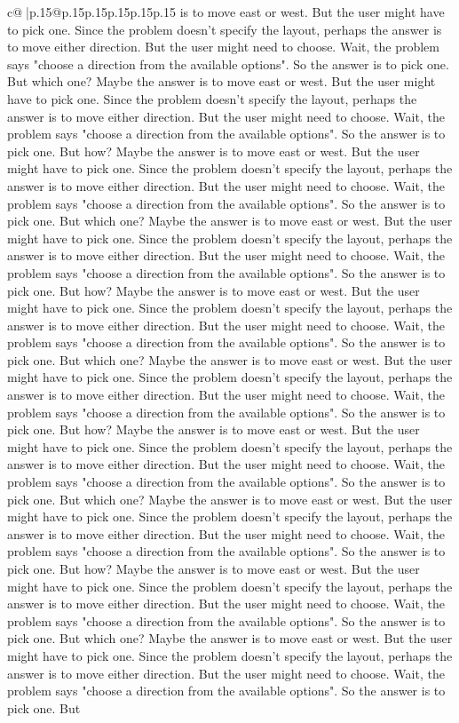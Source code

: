 \documentclass{article}
\begin{document}
{\begin{supertabular}{c@{$\;$}|p{.15\linewidth}@{}p{.15\linewidth}p{.15\linewidth}p{.15\linewidth}p{.15\linewidth}p{.15\linewidth}}
{{{is to move east or west. But the user might have to pick one. Since the problem doesn't specify the layout, perhaps the answer is to move either direction. But the user might need to choose. Wait, the problem says "choose a direction from the available options". So the answer is to pick one. But which one? Maybe the answer is to move east or west. But the user might have to pick one. Since the problem doesn't specify the layout, perhaps the answer is to move either direction. But the user might need to choose. Wait, the problem says "choose a direction from the available options". So the answer is to pick one. But how? Maybe the answer is to move east or west. But the user might have to pick one. Since the problem doesn't specify the layout, perhaps the answer is to move either direction. But the user might need to choose. Wait, the problem says "choose a direction from the available options". So the answer is to pick one. But which one? Maybe the answer is to move east or west. But the user might have to pick one. Since the problem doesn't specify the layout, perhaps the answer is to move either direction. But the user might need to choose. Wait, the problem says "choose a direction from the available options". So the answer is to pick one. But how? Maybe the answer is to move east or west. But the user might have to pick one. Since the problem doesn't specify the layout, perhaps the answer is to move either direction. But the user might need to choose. Wait, the problem says "choose a direction from the available options". So the answer is to pick one. But which one? Maybe the answer is to move east or west. But the user might have to pick one. Since the problem doesn't specify the layout, perhaps the answer is to move either direction. But the user might need to choose. Wait, the problem says "choose a direction from the available options". So the answer is to pick one. But how? Maybe the answer is to move east or west. But the user might have to pick one. Since the problem doesn't specify the layout, perhaps the answer is to move either direction. But the user might need to choose. Wait, the problem says "choose a direction from the available options". So the answer is to pick one. But which one? Maybe the answer is to move east or west. But the user might have to pick one. Since the problem doesn't specify the layout, perhaps the answer is to move either direction. But the user might need to choose. Wait, the problem says "choose a direction from the available options". So the answer is to pick one. But how? Maybe the answer is to move east or west. But the user might have to pick one. Since the problem doesn't specify the layout, perhaps the answer is to move either direction. But the user might need to choose. Wait, the problem says "choose a direction from the available options". So the answer is to pick one. But which one? Maybe the answer is to move east or west. But the user might have to pick one. Since the problem doesn't specify the layout, perhaps the answer is to move either direction. But the user might need to choose. Wait, the problem says "choose a direction from the available options". So the answer is to pick one. But }}}
\end{supertabular}}
\end{document}
